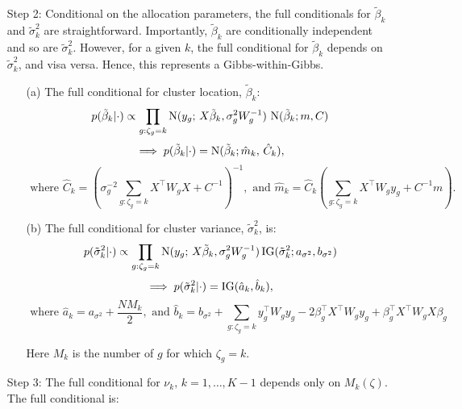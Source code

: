 \begin{enumerate}
\item[Step 2:] Conditional on the allocation parameters, the full conditionals for $\tilde{\beta}_k$ and $\tilde{\sigma}^2_k$ are straightforward. Importantly, $\tilde{\beta}_k$ are conditionally independent and so are $\tilde{\sigma}^2_k$. However, for a given $k$, the full conditional for $\tilde{\beta}_k$ depends on $\tilde{\sigma}^2_k$, and visa versa. Hence, this represents a Gibbs-within-Gibbs.
  \begin{enumerate}
  \item[(a)] The full conditional for cluster location, $\tilde{\beta}_k$:
    \begin{equation}
      p(\tilde{\beta}_k|\cdot) \propto \prod_{g:\zeta_g=k} \operatorname{N}(y_g;\,X\tilde{\beta}_k, \sigma^2_gW^{-1}_g)\,\operatorname{N}(\tilde{\beta}_k; m, C)
    \end{equation}
    \begin{equation*}
      \implies p(\tilde{\beta}_k|\cdot) = \operatorname{N}(\tilde{\beta}_k; \hat{m}_k,\, \hat{C}_k),
    \end{equation*}
    \begin{equation*}
    \mbox{ where }\hat{C}_k= \left( \sigma^{-2}_g\sum_{g:\zeta_g=k}
      X^\top W_g X + C^{-1} \right)^{-1}, \mbox{ and
    }\hat{m}_k=\hat{C}_k \left(\sum_{g:\zeta_g=k} X^\top W_g y_g +
      C^{-1}m \right).
    \end{equation*}
  \item[(b)] The full conditional for cluster variance, $\tilde{\sigma}_k^2$, is:
    \begin{equation}
      p(\tilde{\sigma}_k^2|\cdot) \propto \prod_{g:\zeta_g=k}
      \operatorname{N}(y_g;\,X\tilde{\beta}_k, \sigma^2_gW^{-1}_g)
      \operatorname{IG}(\tilde{\sigma}_k^2; a_{\sigma^2},b_{\sigma^2})
    \end{equation}
    \begin{equation*}
      \implies p(\tilde{\sigma}_k^2|\cdot) = \operatorname{IG}(\hat{a}_k,\hat{b}_k), 
    \end{equation*}
    \begin{equation*}
      \mbox{ where }\hat{a}_k = a_{\sigma^2} + \frac{NM_k}{2},\mbox{ and }\hat{b}_k= b_{\sigma^2} + \sum_{g:\zeta_g=k}y_g^\top W_g y_g -2 \beta_g^\top X^\top W_g y_g  +\beta_g^\top X^\top W_g X \beta_g
    \end{equation*}

    Here $M_k$ is the number of $g$ for which $\zeta_g = k$. 
  \end{enumerate}
\item[Step 3:] The full conditional for $\nu_k,\,k=1,\ldots,K-1$ depends only on $M_k(\zeta)$. The full conditional is:


\end{enumerate}
